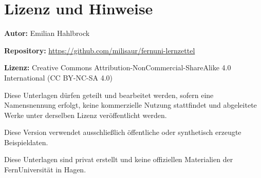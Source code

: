 \clearpage
\thispagestyle{empty}

\section*{Lizenz und Hinweise}

\textbf{Autor:} Emilian Hahlbrock

\medskip

\textbf{Repository:} \url{https://github.com/milisaur/fernuni-lernzettel}

\medskip

\textbf{Lizenz:} Creative Commons Attribution-NonCommercial-ShareAlike 4.0 International (CC BY-NC-SA 4.0)

\medskip

Diese Unterlagen dürfen geteilt und bearbeitet werden, sofern eine Namensnennung erfolgt, keine kommerzielle Nutzung stattfindet und abgeleitete Werke unter derselben Lizenz veröffentlicht werden.

\medskip

Diese Version verwendet ausschließlich öffentliche oder synthetisch erzeugte Beispieldaten.

\medskip

Diese Unterlagen sind privat erstellt und keine offiziellen Materialien der FernUniversität in Hagen.

\clearpage
